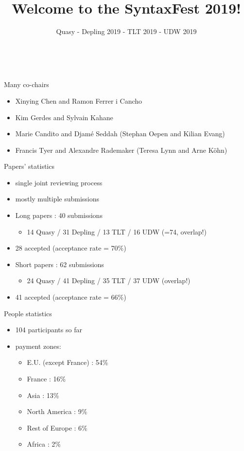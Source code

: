 \documentclass{beamer}
\author{\footnotesize{Quasy - Depling 2019 - TLT 2019 - UDW 2019}}
\title[SyntaxFest 2019 - Paris - 26-30 August]{Welcome to the SyntaxFest 2019!}
\date{\hlcolor{Paris}\\{\ccolor{26-30 August 2019}}}
\begin{document}
\frame[plain]{\titlepage}


\begin{frame}{Many co-chairs}
  \begin{itemize}
    \item Xinying Chen and Ramon Ferrer i Cancho
    \item Kim Gerdes and Sylvain Kahane
    \item Marie Candito and Djamé Seddah (Stephan Oepen and Kilian Evang)
    \item Francis Tyer and Alexandre Rademaker (Teresa Lynn and Arne Köhn)
  \end{itemize}
\end{frame}

\begin{frame}{Papers' statistics}

\begin{itemize}
\item single joint reviewing process
\item mostly multiple submissions
\vspace{2mm}
\item Long papers : 40 submissions
\begin{itemize}
\item 14 Quasy / 31 Depling / 13 TLT / 16 UDW (=74, overlap!)
\end{itemize}
\item 28 accepted (acceptance rate = 70\%)

\item Short papers : 62 submissions
\begin{itemize}
\item 24 Quasy / 41 Depling / 35 TLT / 37 UDW (overlap!)
\end{itemize}
\item 41 accepted (acceptance rate = 66\%)

\end{itemize}

\end{frame}


\begin{frame}{People statistics}

\begin{itemize}
\item 104 participants so far
\item payment zones:
\begin{itemize}
\item E.U. (except France) : 54\%
\item France : 16\%
\item Asia : 13\%
\item North America : 9\%
\item Rest of Europe : 6\%
\item Africa : 2\%
\end{itemize}

\end{itemize}

\end{frame}
\end{document}
